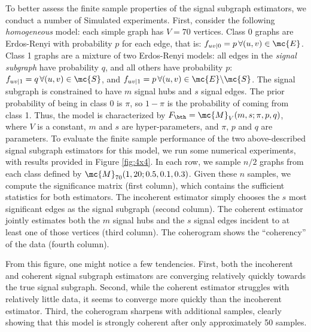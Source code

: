 \documentclass[10pt,journal,cspaper,compsoc]{IEEEtran}
\begin{document}
To better assess the finite sample properties of the signal subgraph estimators, we conduct a number of Simulated experiments.  First, consider the following \emph{homogeneous} model: each simple graph has $V=70$ vertices.  Class 0 graphs are Erdos-Renyi with probability $p$ for each edge, that is: $f_{uv|0}=p \, \forall (u,v) \in \mc{E}$.  Class 1 graphs are a mixture of two Erdos-Renyi models: all edges in the \emph{signal subgraph} have probability $q$, and all others have probability $p$: $f_{uv|1}=q \, \forall (u,v) \in \mc{S}$, and $f_{uv|1}=p \, \forall (u,v) \in \mc{E} \backslash \mc{S}$.  The signal subgraph is constrained to have $m$ signal hubs and $s$ signal edges.  The prior probability of being in class 0 is $\pi$, so $1-\pi$ is the probability of coming from class 1. Thus, the model is characterized by $F_{\bth}=\mc{M}_V(m,s; \pi,p,q)$, where $V$ is a constant, $m$ and $s$ are hyper-parameters, and $\pi$, $p$ and $q$ are parameters.  To evaluate the finite sample performance of the two above-described signal subgraph estimators for this model, we run some numerical experiments, with results provided in Figure \ref{fig:4x4}.  In each row, we sample $n/2$ graphs from each class defined by $\mc{M}_{70}(1,20;0.5,0.1,0.3)$.  Given these $n$ samples, we compute the significance matrix (first column), which contains the sufficient statistics for both estimators.  The incoherent estimator simply chooses the $s$ most significant edges as the signal subgraph (second column). The coherent estimator jointly estimates both the $m$ signal hubs and the $s$ signal edges incident to at least one of those vertices (third column).  The coherogram shows the ``coherency'' of the data (fourth column).    

From this figure, one might notice a few tendencies.  First, both the incoherent and coherent signal subgraph estimators are converging relatively quickly towards the true signal subgraph.  Second, while the coherent estimator struggles with relatively little data, it seems to converge more quickly than the incoherent estimator.  Third, the coherogram sharpens with additional samples, clearly showing that this model is strongly coherent after only approximately 50 samples.
\end{document}
